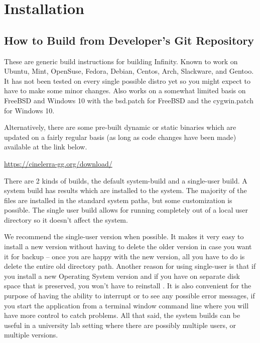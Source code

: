 \chapter{Installation}
\label{cha:Installation}
\section{How to Build \CGG{} from Developer's Git Repository}%
\label{sec:How_to_build}

These are generic build instructions for building \CGG{} Infinity.
Known to work on Ubuntu, Mint, OpenSuse, Fedora, Debian, Centos,
Arch, Slackware, and Gentoo.  It has not been tested on every
single possible distro yet so you might expect to have to make
some minor changes.  Also works on a somewhat limited basis on
FreeBSD and Windows 10 with the bsd.patch for FreeBSD and the
cygwin.patch for Windows 10.

Alternatively, there are some pre-built dynamic or static binaries
which are updated on a fairly regular basis (as long as code changes
have been made) available at the link below.
\begin{center}
  \href{https://cinelerra-gg.org/download/}{https://cinelerra-gg.org/download/}
\end{center}

There are 2 kinds of builds, the default system-build and a
single-user build.  A system build has results which are installed
to the system.  The majority of the files are installed in the
standard system paths, but some customization is possible.  The
single user build allows for running completely out of a local
user directory so it doesn't affect the system.

We recommend the single-user version when possible.  It makes it
very easy to install a new version without having to delete the
older version in case you want it for backup -- once you are happy
with the new version, all you have to do is delete the entire old
directory path.  Another reason for using single-user is that if
you install a new Operating System version and if you have \CGG{}
on separate disk space that is preserved, you won't have to
reinstall \CGG{}.  It is also convenient for the purpose of having
the ability to interrupt or to see any possible error messages, if
you start the application from a terminal window command line
where you will have more control to catch problems.  All that
said, the system builds can be useful in a university lab setting
where there are possibly multiple users, or multiple versions.

